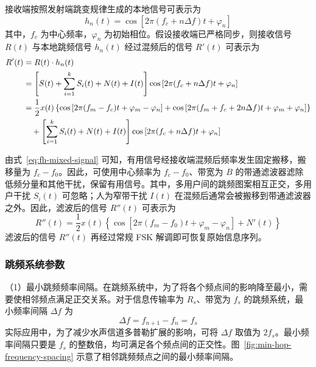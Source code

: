 接收端按照发射端跳变规律生成的本地信号可表示为
\begin{equation}
h_n(t)=\cos\left[2\pi(f_c+n\Delta f)t+\varphi_n\right]
\label{eq:fh-local-signal}
\end{equation}
其中，$f_c$ 为中心频率，$\varphi_n$ 为初始相位。假设接收端已严格同步，则接收信号 $R(t)$ 与本地跳频信号 $h_n(t)$ 经过混频后的信号 $R'(t)$ 可表示为
\begin{align}
R'(t)
&=R(t)\cdot h_n(t) \notag\\
&=\left[S(t)+\sum_{i=1}^{k}S_i(t)+N(t)+I(t)\right]
\cos\left[2\pi(f_c+n\Delta f)t+\varphi_n\right] \notag\\
&=\frac{1}{2}x(t)\left\{
\cos\left[2\pi(f_m-f_c)t+\varphi_m-\varphi_n\right]
+\cos\left[2\pi(f_m+f_c+2n\Delta f)t+\varphi_m+\varphi_n\right]\right\}
\notag\\
&\quad+\left[\sum_{i=1}^{k}S_i(t)+N(t)+I(t)\right]
\cos\left[2\pi(f_c+n\Delta f)t+\varphi_n\right]
\label{eq:fh-mixed-signal}
\end{align}

由式~\eqref{eq:fh-mixed-signal} 可知，有用信号经接收端混频后频率发生固定搬移，搬移量为 $f_c-f_0$。因此，可使用中心频率为 $f_c-f_0$、带宽为 $B$ 的带通滤波器滤除低频分量和其他干扰，保留有用信号。其中，多用户间的跳频图案相互正交，多用户干扰 $S_i(t)$ 可忽略；人为窄带干扰 $I(t)$ 在混频后通常会被搬移到带通滤波器之外。因此，滤波后的信号 $R''(t)$ 可表示为
\begin{equation}
R''(t)=\frac{1}{2}x(t)\left\{\cos\left[2\pi(f_m-f_0)t+\varphi_m-\varphi_n\right]+N'(t)\right\}
\label{eq:fh-filtered-signal}
\end{equation}
滤波后的信号 $R''(t)$ 再经过常规 FSK 解调即可恢复原始信息序列。

\subsubsection{跳频系统参数}

（1）最小跳频频率间隔。在跳频系统中，为了将各个频点间的影响降至最小，需要使相邻频点满足正交关系。对于信息传输率为 $R_s$、带宽为 $f_s$ 的跳频系统，最小频率间隔 $\Delta f$ 为
\begin{equation}
\Delta f=f_{n+1}-f_n=f_s
\label{eq:fh-min-frequency-spacing}
\end{equation}
实际应用中，为了减少水声信道多普勒扩展的影响，可将 $\Delta f$ 取值为 $2f_s$。最小频率间隔只要是 $f_s$ 的整数倍，均可满足各个频点间的正交性。图~\ref{fig:min-hop-frequency-spacing} 示意了相邻跳频频点之间的最小频率间隔。

